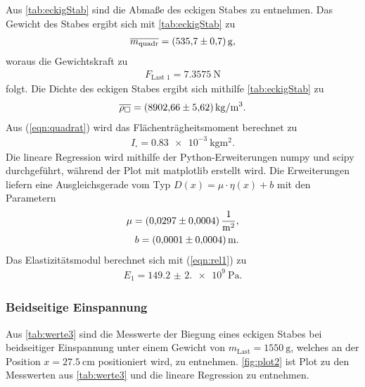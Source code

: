 \sloppy
Aus \autoref{tab:eckigStab} sind die Abmaße des eckigen Stabes zu entnehmen. Das Gewicht des Stabes ergibt sich mit \autoref{tab:eckigStab} zu 
\begin{align*}
  \overline{m_{\text{quadr}}} = \SI{535,7 (0,7)}{\gram},
\end{align*}
woraus die Gewichtskraft zu 
\begin{align*}
  F_{\text{Last 1}} = \SI{7,3575}{\newton}
\end{align*} 
folgt. 
Die Dichte des eckigen Stabes ergibt sich mithilfe \autoref{tab:eckigStab} zu
\begin{align*}
  \overline{\rho_\square} = \SI{8902.66 (5.62)}{\kilo\gram\per\meter^3}.
\end{align*}
Aus (\ref{eqn:quadrat}) wird das Flächenträgheitsmoment berechnet zu
\begin{align*}
  I_{\square} = \SI{0.83e-3}{\kilo\gram\meter^2}.
\end{align*}
Die lineare Regression wird mithilfe der Python-Erweiterungen numpy \cite{numpy} und scipy \cite{scipy} durchgeführt, während
der Plot mit matplotlib \cite{matplotlib} erstellt wird. Die Erweiterungen liefern eine Ausgleichsgerade vom Typ $D(x) = \mu\cdot\eta(x)+b$
mit den Parametern
\begin{align*}
  \mu = \SI{0.0297 (0.0004)}{\per\square\meter}, \\
  b = \SI{0.0001 (0.0004)}{\meter}. \\
\end{align*}
Das Elastizitätsmodul berechnet sich mit (\ref{eqn:rel1}) zu
\begin{align*}
  E_1 = \SI{149.2(2.0)e9}{\Pa}.
\end{align*}

\subsubsection{Beidseitige Einspannung}
\label{subsubsec:beidsEck}
Aus \autoref{tab:werte3} sind die Messwerte der Biegung eines eckigen Stabes bei beidseitiger Einspannung unter einem Gewicht von
$m_{\text{Last}} = \SI{1550}{\gram}$, welches an der Position $x= \SI{27.5}{\cm}$ positioniert wird, zu entnehmen.
\autoref{fig:plot2} ist Plot zu den Messwerten aus \autoref{tab:werte3} und die lineare Regression zu entnehmen.



